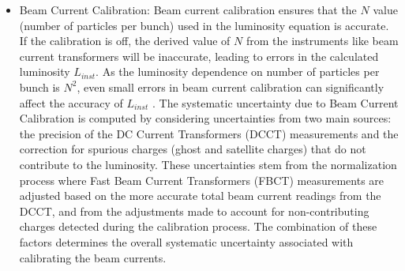 \begin{itemize}
\item Beam Current Calibration:  Beam current calibration ensures that the \( N \) value (number of particles per bunch) used in the luminosity equation is accurate. If the calibration is off, the derived value of \( N \) from the instruments like beam current transformers will be inaccurate, leading to errors in the calculated luminosity $L_{inst}$. As the luminosity dependence on number of particles per bunch is $N^2$, even small errors in beam current calibration can significantly affect the accuracy of $L_{inst}$ \cite{CERNLumiDays}. The systematic uncertainty due to Beam Current Calibration is computed by considering uncertainties from two main sources: the precision of the DC Current Transformers (DCCT) measurements and the correction for spurious charges (ghost and satellite charges) that do not contribute to the luminosity. These uncertainties stem from the normalization process where Fast Beam Current Transformers (FBCT) measurements are adjusted based on the more accurate total beam current readings from the DCCT, and from the adjustments made to account for non-contributing charges detected during the calibration process. The combination of these factors determines the overall systematic uncertainty associated with calibrating the beam currents.



\end{itemize}
